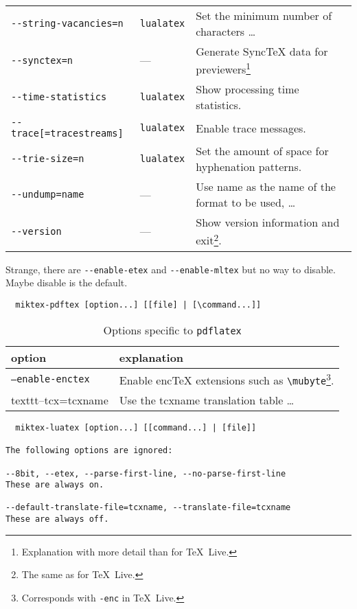 \documentclass{article}
\newcommand{\pdflatex}{\texttt{pdflatex}}
\newcommand{\lualatex}{\texttt{lualatex}}
\newcommand{\texlive}{\TeX~Live}
\begin{document}
\begin{longtable}{|lll|}
\texttt{-{}-string-vacancies=n}      & \lualatex{} & Set the minimum number of characters \dots \\
\texttt{-{}-synctex=n}               & ---         & Generate SyncTeX data for previewers\footnote%
{Explanation with more detail than for \texlive. } \\
\texttt{-{}-time-statistics}         & \lualatex{} & Show processing time statistics. \\
\texttt{-{}-trace[=tracestreams]}    & \lualatex{} & Enable trace messages. \\
\texttt{-{}-trie-size=n}             & \lualatex{} & Set the amount of space for hyphenation patterns. \\
\texttt{-{}-undump=name}             & ---         & Use name as the name of the format to be used, \dots \\
\texttt{-{}-version}                 & ---         & Show version information and exit\footnote%
{The same as for \texlive. }. \\
\end{longtable}

Strange, there are \texttt{-{}-enable-etex} and \texttt{-{}-enable-mltex} 
but no way to disable. 
Maybe disable is the default. 

\begin{verbatim}
  miktex-pdftex [option...] [[file] | [\command...]]
\end{verbatim}

\begin{longtable}{|ll|}
  \toprule
  option & explanation \\
  \midrule
  \midrule
  \endfirsthead%
  \bottomrule
  \caption{\label{tab:latexOptionsPdflatexMiktex} Options specific to \pdflatex{} }
  \endlastfoot%
  \texttt{--enable-enctex} & Enable encTeX extensions such as \texttt{\textbackslash{}mubyte}\footnote%
  {Corresponds with \texttt{-enc} in \texlive. }. \\
  texttt{--tcx=tcxname}    & Use the tcxname translation table \dots \\
  \end{longtable}




\begin{verbatim}
  miktex-luatex [option...] [[command...] | [file]]

The following options are ignored:

--8bit, --etex, --parse-first-line, --no-parse-first-line
These are always on.

--default-translate-file=tcxname, --translate-file=tcxname
These are always off.
\end{verbatim}
\end{document}
